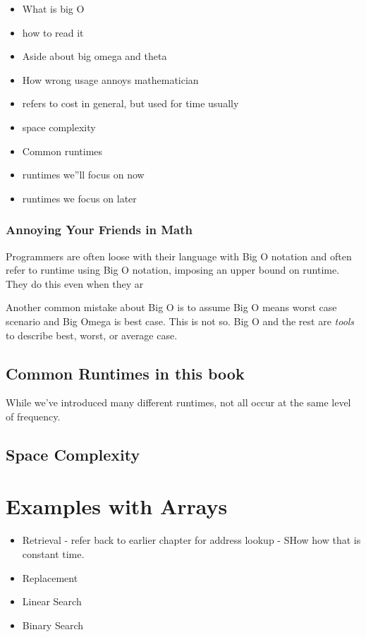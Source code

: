 \begin{itemize}
	\item What is big O
	
	\item  how to read it
	\item Aside about big omega and theta
	\item How wrong usage annoys mathematician
	\item refers to cost in general, but used for time usually
	\item  space complexity 
	\item Common runtimes
	\item runtimes we''ll focus on now
	\item runtimes we focus on later
\end{itemize}

\subsubsection{Annoying Your Friends in Math}

Programmers are often loose with their language with Big O notation and often refer to runtime using Big O notation, imposing an upper bound on runtime.  They do this even when they ar

Another common mistake about Big O is to assume Big O means worst case scenario and Big Omega is best case.  This is not so.  Big O and the rest are \emph{tools} to describe best, worst, or average case.

\subsection{Common Runtimes in this book}
While we've introduced many different runtimes, not all occur at the same level of frequency.





\subsection{Space Complexity}




\section{Examples with Arrays}




\begin{itemize}
	
	\item Retrieval  - refer back to earlier chapter for address lookup - SHow how that is constant time.
	\item Replacement
	\item Linear Search
	\item Binary Search
\end{itemize}



